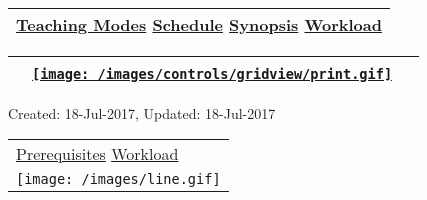 ~

\hypertarget{ctl00_ctl00_ContentPlaceHolder1_ContentPlaceHolder1_pnlReferences}{}
\begin{longtable}[]{@{}l@{}}
\toprule
\protect\hypertarget{ctl00_ctl00_ContentPlaceHolder1_ContentPlaceHolder1_lblSectionBottom}{}{\protect\hyperlink{Teachingux5cux2520Modes}{Teaching
Modes} \textbar{} \protect\hyperlink{Schedule}{Schedule} \textbar{}
\protect\hyperlink{Synopsis}{Synopsis} \textbar{}
\protect\hyperlink{Workload}{Workload}}\tabularnewline
\bottomrule
\end{longtable}

\hypertarget{ctl00_ctl00_ContentPlaceHolder1_ContentPlaceHolder1_UP}{}
\hypertarget{contentstart}{}
\hypertarget{ctl00_ctl00_ContentPlaceHolder1_ContentPlaceHolder1_pnlMain}{}
\begin{longtable}[]{@{}ll@{}}
\toprule
&
{\href{javascript:PrintThisPage();}{\texttt{[image: /images/controls/gridview/print.gif]}}~~}\tabularnewline
\bottomrule
\end{longtable}

\protect\hypertarget{ctl00_ctl00_ContentPlaceHolder1_ContentPlaceHolder1_LV_UpdateInfo_ctrl0_txtDate}{}{Created:
18-Jul-2017, Updated: 18-Jul-2017}

\begin{longtable}[]{@{}l@{}}
\toprule
\protect\hypertarget{ctl00_ctl00_ContentPlaceHolder1_ContentPlaceHolder1_lblSectionTop}{}{\protect\hyperlink{Prerequisites}{Prerequisites}
\textbar{} \protect\hyperlink{Workload}{Workload}}\tabularnewline
\texttt{[image: /images/line.gif]}\tabularnewline
\bottomrule
\end{longtable}

